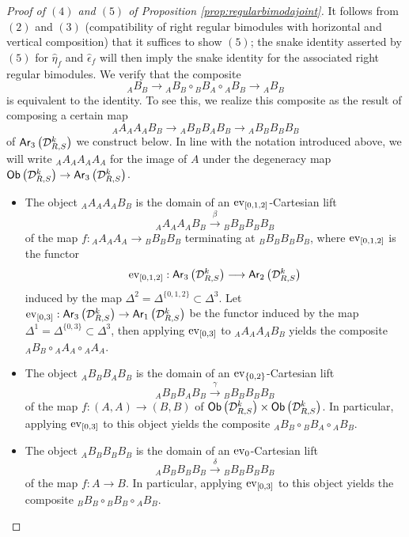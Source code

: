 \documentclass[10pt, reqno, twoside
, final
]{amsart}
\numberwithin{equation}{subsection}%
\theoremstyle{definition}
\theoremstyle{definition}
\theoremstyle{definition}
\theoremstyle{definition}
\theoremstyle{definition}
\theoremstyle{definition}
\theoremstyle{definition}
\theoremstyle{definition}
\theoremstyle{definition}
\theoremstyle{plain}
\theoremstyle{definition}
\theoremstyle{plain}
\theoremstyle{definition}
\theoremstyle{plain}
\theoremstyle{definition}
\theoremstyle{definition}
\theoremstyle{plain}
\theoremstyle{plain}
\theoremstyle{definition}
\theoremstyle{plain}
\theoremstyle{plain}
\theoremstyle{plain}
\begin{document}
\begin{proof}[Proof of $(4)$ and $(5)$ of Proposition \ref{prop:regularbimodajoint}]
It follows from $(2)$ and $(3)$ (compatibility of right regular bimodules with horizontal and vertical composition) that it suffices to show $(5)$; the snake identity asserted by $(5)$ for $\widehat{\eta}_f$ and $\widehat{\epsilon}_f$ will then imply the snake identity for the associated right regular bimodules. We verify that the composite 
\[  {}_AB_B \longrightarrow  {}_AB_B\circ {}_BB_A\circ  {}_AB_B  \longrightarrow {}_AB_B  \]
is equivalent to the identity. To see this, we realize this composite as the result of composing a certain map
\[  {}_AA_AA_AB_B \longrightarrow  {}_AB_BB_AB_B\longrightarrow {}_AB_B B_B B_B  \]
of $\mathsf{Ar}_3\left(\mathcal{D}^k_{R,S}\right)$ we construct below. In line with the notation introduced above, we will write ${}_AA_AA_AA_A$ for the image of $A$ under the degeneracy map $\mathsf{Ob}\left(\mathcal{D}^k_{R,S}\right)\rightarrow \mathsf{Ar}_3\left(\mathcal{D}^k_{R,S}\right)$.
\begin{itemize}
    \item The object ${}_AA_AA_AB_B$ is the domain of an $\mathrm{ev}_{[0,1,2]}$-Cartesian lift
    \[  {}_AA_AA_AB_B\overset{\beta}{\longrightarrow} {}_BB_BB_BB_B \]
    of the map $f:{}_AA_AA_A\rightarrow {}_BB_BB_B$ terminating at ${}_BB_BB_BB_B$, where $\mathrm{ev}_{[0,1,2]}$ is the functor 
    \[ \mathrm{ev}_{[0,1,2]}: \mathsf{Ar}_{3}\left(\mathcal{D}^{k}_{R,S}\right) \longrightarrow  \mathsf{Ar}_{2}\left(\mathcal{D}^{k}_{R,S}\right)  \]
    induced by the map $\Delta^2=\Delta^{\{0,1,2\}}\subset \Delta^3$. Let $\mathrm{ev}_{[0,3]}:\mathsf{Ar}_{3}\left(\mathcal{D}^{k}_{R,S}\right) \rightarrow  \mathsf{Ar}_{1}\left(\mathcal{D}^{k}_{R,S}\right) $ be the functor induced by the map $\Delta^1=\Delta^{\{0,3\}}\subset\Delta^3$, then applying $\mathrm{ev}_{[0,3]}$ to ${}_AA_AA_AB_B$ yields the composite $ {}_AB_B\circ {}_AA_A\circ {}_AA_A $.
    \item The object $ {}_AB_BB_AB_B$ is the domain of an $\mathrm{ev}_{\{0,2\}}$-Cartesian lift
    \[  {}_AB_BB_AB_B\overset{\gamma}{\longrightarrow} {}_BB_BB_BB_B \]
    of the map $f:(A,A)\rightarrow (B,B)$ of $\mathsf{Ob}\left(\mathcal{D}^k_{R,S}\right)\times \mathsf{Ob}\left(\mathcal{D}^k_{R,S}\right)$. In particular, applying $\mathrm{ev}_{[0,3]}$ to this object yields the composite ${}_AB_B\circ {}_BB_A\circ {}_AB_B$. 
     \item The object $ {}_AB_BB_BB_B$ is the domain of an $\mathrm{ev}_{0}$-Cartesian lift
     \[  {}_AB_BB_BB_B\overset{\delta}{\longrightarrow} {}_BB_BB_BB_B \]
     of the map $f:A\rightarrow B$. In particular, applying $\mathrm{ev}_{[0,3]}$ to this object yields the composite $ {}_BB_B\circ {}_BB_B\circ {}_AB_B$.

\end{itemize}
\end{proof}
\end{document}
